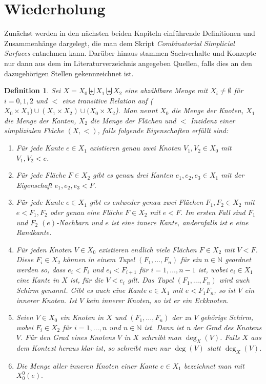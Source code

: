 \documentclass[12pt,titlepage,twoside,cleardoublepage]{article}
\theoremstyle{nummermitklammern}
\newtheorem{definition}[temp]{Definition}
\newtheorem{definition}[zahl]{Definition}
\numberwithin{equation}{section}
\begin{document}
\section{Wiederholung} 
Zunächst werden in den nächsten beiden Kapiteln einführende Definitionen und Zusammenhänge dargelegt, die man dem Skript \emph{Combinatorial Simplicial Surfaces} entnehmen kann. Darüber hinaus stammen Sachverhalte und Konzepte nur dann aus dem im Literaturverzeichnis angegeben Quellen, falls dies an den dazugehörigen Stellen gekennzeichnet ist.
\begin{definition}  \label{def1} Sei $X=X_{0} \biguplus X_{1} \biguplus X_{2}$ eine abzählbare Menge mit $X_{i} \ne \emptyset$ für $i=0,1,2$ und $<$ eine transitive Relation auf  ($X_{0}\times X_{1}) \cup (X_{1}\times X_{2})\cup (X_{0}\times X_{2}$). Man nennt $X_{0}$ \emph{die Menge der Knoten}, $X_{1}$ \emph{die Menge der Kanten}, $X_{2}$ \emph{die Menge der Flächen} und $<$ \emph{Inzidenz} einer \emph{simplizialen Fläche} $(X,<)$, falls folgende Eigenschaften erfüllt sind:
 \begin{enumerate}
\item Für jede Kante $e \in X_{1}$ existieren genau zwei Knoten $V_1,V_2 \in X_{0}$ mit $V_1,V_2 < e$. 
\item Für jede Fläche $F\in X_2$ gibt es genau drei Kanten $e_1,e_2,e_3 \in X_{1}$ mit der Eigenschaft $e_1,e_2,e_3 < F$. 
\item Für jede Kante $e \in X_{1}$ gibt es entweder genau zwei Flächen $F_{1},F_{2} \in X_{2}$ mit $e <F_{1},F_2$ oder
genau eine Fläche $F \in X_{2}$ mit $e < F$. Im ersten Fall sind $F_{1}$ und $F_{2}$ \emph{$(e)$-Nachbarn} und $e$ ist eine \emph{innere Kante}, andernfalls ist $e$ eine \emph{Randkante}. 
 \item Für jeden Knoten $V \in X_{0}$ existieren endlich viele Flächen $F\in X_{2}$ mit $V < F$.
  Diese $F_{i}\in X_2$ können in einem Tupel $(F_{1},\ldots,F_{n})$ für ein $n \in \mathbb{N}$ geordnet werden so, dass $e_i<F_{i}$ und $e_i<F_{i+1}$ für $i=1,\ldots,n-1$ ist, wobei $e_i\in X_1$ eine Kante  in $X$ ist, für die $V<e_i$ gilt. 
  Das Tupel $(F_1,\ldots,F_n)$ wird auch \emph{Schirm} genannt. Gibt es auch eine Kante $e\in X_1$ mit $e<F_{1}F_{n}$, so ist $V$ ein \emph{innerer Knoten}. Ist $V$ kein innerer Knoten, so ist er 
 ein Eckknoten.  
 \item Seien $V \in X_0$ ein Knoten in $X$ und $(F_1,\ldots,F_n)$ der zu $V$ gehörige Schirm, wobei $F_i \in X_2$ für $i=1,\ldots ,n$ und $n\in \mathbb{N}$ ist. Dann ist n der \emph{Grad des Knotens} $V$. Für den Grad eines Knotens $V$ in $X$ schreibt man $\deg_X(V)$. Falls $X$ aus dem Kontext heraus klar ist, so schreibt man nur $\deg(V)$ statt $\deg_X(V)$.
 \item Die Menge aller inneren Knoten einer Kante $e \in X_1$ bezeichnet man mit $X_0^0(e).$
\end{enumerate}
\end{definition}
\end{document}
